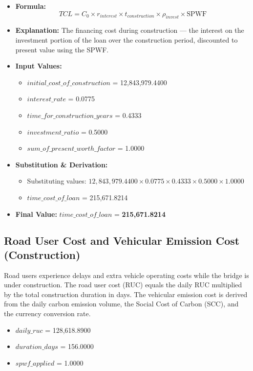 \documentclass[12pt,a4paper]{article}
\begin{document}
\begin{itemize}
  \item \textbf{Formula:} $$TCL = C_0 \times r_{interest} \times t_{construction} \times \rho_{invest} \times \text{SPWF}$$
  \item \textbf{Explanation:} The financing cost during construction — the interest on the investment portion of the loan over the construction period, discounted to present value using the SPWF.
  \item \textbf{Input Values:}
  \begin{itemize}
    \item $initial\_cost\_of\_construction$ = 12,843,979.4400
    \item $interest\_rate$ = 0.0775
    \item $time\_for\_construction\_years$ = 0.4333
    \item $investment\_ratio$ = 0.5000
    \item $sum\_of\_present\_worth\_factor$ = 1.0000
  \end{itemize}
  \item \textbf{Substitution \& Derivation:}
  \begin{itemize}
    \item Substituting values: $12,843,979.4400 \times 0.0775 \times 0.4333 \times 0.5000 \times 1.0000$
    \item $time\_cost\_of\_loan$ = 215,671.8214
  \end{itemize}
  \item \textbf{Final Value:} $time\_cost\_of\_loan$ = \textbf{215,671.8214}
\end{itemize}


\subsection{Road User Cost and Vehicular Emission Cost (Construction)}

Road users experience delays and extra vehicle operating costs while the bridge is under construction. The road user cost (RUC) equals the daily RUC multiplied by the total construction duration in days. The vehicular emission cost is derived from the daily carbon emission volume, the Social Cost of Carbon (SCC), and the currency conversion rate.


\begin{itemize}
  \item $daily\_ruc$ = 128,618.8900
  \item $duration\_days$ = 156.0000
  \item $spwf\_applied$ = 1.0000
\end{itemize}
\end{document}

